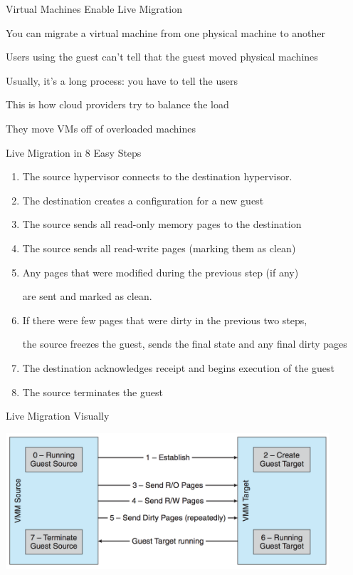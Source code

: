  \begin{frame}{Virtual Machines Enable Live Migration}

    You can migrate a virtual machine from one physical machine to another

    \vspace{2em}

    Users using the guest can't tell that the guest moved physical machines

    \hspace{2em} Usually, it's a long process: you have to tell the users

    \vspace{2em}

    This is how cloud providers try to balance the load

    \hspace{2em} They move VMs off of overloaded machines
  \end{frame}

  \begin{frame}{Live Migration in 8 Easy Steps}
    \begin{enumerate}
      \item The source hypervisor connects to the destination hypervisor.
      \item The destination creates a configuration for a new guest
      \item The source sends all read-only memory pages to the destination
      \item The source sends all read-write pages (marking them as clean)
      \item Any pages that were modified during the previous step (if any)

            are sent and marked as clean. 
      \item If there were few pages that were dirty in the previous two steps,

             the source freezes the guest, sends the final state and any final
             dirty pages
      \item The destination acknowledges receipt and begins execution of the guest
      \item The source terminates the guest
    \end{enumerate}
  \end{frame}

  \begin{frame}{Live Migration Visually}
    \begin{center}
      \includegraphics[width=0.9\textwidth]{live-migration.png}
    \end{center}
  \end{frame}

